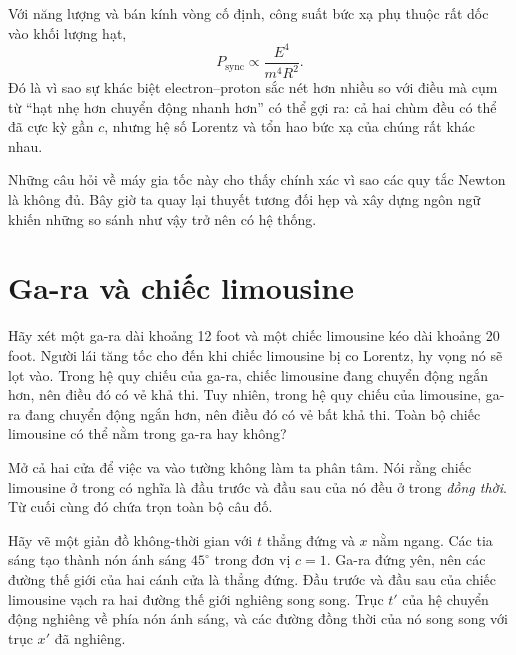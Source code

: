 Với năng lượng và bán kính vòng cố định, công suất bức xạ phụ thuộc rất dốc vào khối lượng hạt,
\begin{equation}
P_{\mathrm{sync}}\propto \frac{E^4}{m^4R^2}.
\end{equation}
Đó là vì sao sự khác biệt electron--proton sắc nét hơn nhiều so với điều mà cụm từ ``hạt nhẹ hơn chuyển động nhanh hơn'' có thể gợi ra: cả hai chùm đều có thể đã cực kỳ gần \(c\), nhưng hệ số Lorentz và tổn hao bức xạ của chúng rất khác nhau.

\begin{classroomqa}
\end{classroomqa}

Những câu hỏi về máy gia tốc này cho thấy chính xác vì sao các quy tắc Newton là không đủ. Bây giờ ta quay lại thuyết tương đối hẹp và xây dựng ngôn ngữ khiến những so sánh như vậy trở nên có hệ thống.

\section{Ga-ra và chiếc limousine}

Hãy xét một ga-ra dài khoảng 12 foot và một chiếc limousine kéo dài khoảng 20 foot. Người lái tăng tốc cho đến khi chiếc limousine bị co Lorentz, hy vọng nó sẽ lọt vào. Trong hệ quy chiếu của ga-ra, chiếc limousine đang chuyển động ngắn hơn, nên điều đó có vẻ khả thi. Tuy nhiên, trong hệ quy chiếu của limousine, ga-ra đang chuyển động ngắn hơn, nên điều đó có vẻ bất khả thi. Toàn bộ chiếc limousine có thể nằm trong ga-ra hay không?

Mở cả hai cửa để việc va vào tường không làm ta phân tâm. Nói rằng chiếc limousine ở trong có nghĩa là đầu trước và đầu sau của nó đều ở trong \emph{đồng thời}. Từ cuối cùng đó chứa trọn toàn bộ câu đố.

Hãy vẽ một giản đồ không-thời gian với \(t\) thẳng đứng và \(x\) nằm ngang. Các tia sáng tạo thành nón ánh sáng \(45^\circ\) trong đơn vị \(c=1\). Ga-ra đứng yên, nên các đường thế giới của hai cánh cửa là thẳng đứng. Đầu trước và đầu sau của chiếc limousine vạch ra hai đường thế giới nghiêng song song. Trục \(t'\) của hệ chuyển động nghiêng về phía nón ánh sáng, và các đường đồng thời của nó song song với trục \(x'\) đã nghiêng.

